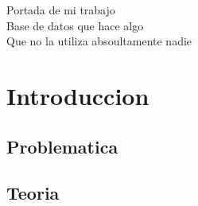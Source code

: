 \documentclass{book}
\begin{document}
\begin{titlepage}
	Portada de mi trabajo \\[1cm] 
	Base de datos que hace algo \\[2cm] 
	Que no la utiliza absoultamente nadie 
\end{titlepage}
\chapter{Introduccion}
\section{Problematica}
\section{Teoria}
\end{document}
